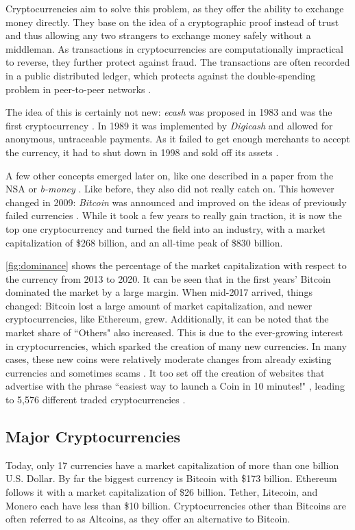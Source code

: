 \documentclass[11pt,a4paper,compsoc,conference]{IEEEtran}
\begin{document}
Cryptocurrencies aim to solve this problem, as they offer the ability to exchange money directly. They base on the idea of a cryptographic proof instead of trust and thus allowing any two strangers to exchange money safely without a middleman. As transactions in cryptocurrencies are computationally impractical to reverse, they further protect against fraud. The transactions are often recorded in a public distributed ledger, which protects against the double-spending problem in peer-to-peer networks \cite{Bitcoin}. 

The idea of this is certainly not new: \textit{ecash} was proposed in 1983 and was the first cryptocurrency \cite{ecash1, ecash2}. In 1989 it was implemented by \textit{Digicash} and allowed for anonymous, untraceable payments. As it failed to get enough merchants to accept the currency, it had to shut down in 1998 and sold off its assets \cite{digicash}.

A few other concepts emerged later on, like one described in a paper from the NSA \cite{nsa} or \textit{b-money} \cite{bmoney}. Like before, they also did not really catch on. This however changed in 2009: \textit{Bitcoin} was announced and improved on the ideas of previously failed currencies \cite{Bitcoin}. While it took a few years to really gain traction, it is now the top one cryptocurrency and turned the field into an industry, with a market capitalization of \$268 billion, and an all-time peak of \$830 billion.




\autoref{fig:dominance} shows the percentage of the market capitalization with respect to the currency from 2013 to 2020. It can be seen that in the first years' Bitcoin dominated the market by a large margin. When mid-2017 arrived, things changed: Bitcoin lost a large amount of market capitalization, and newer cryptocurrencies, like Ethereum, grew. Additionally, it can be noted that the market share of ``Others" also increased. This is due to the ever-growing interest in cryptocurrencies, which sparked the creation of many new currencies. In many cases, these new coins were relatively moderate changes from already existing currencies and sometimes scams \citep{deadcoins}. It too set off the creation of websites that advertise with the phrase ``easiest way to launch a Coin in 10 minutes!" \citep{cryptonote, cryptolife}, leading to 5,576 different traded cryptocurrencies \citep{coinmarketcap}.

\subsection{Major Cryptocurrencies}
Today, only 17 currencies have a market capitalization of more than one billion U.S. Dollar. By far the biggest currency is Bitcoin with \$173 billion. Ethereum follows it with a market capitalization of \$26 billion. Tether, Litecoin, and Monero each have less than \$10 billion. Cryptocurrencies other than Bitcoins are often referred to as Altcoins, as they offer an alternative to Bitcoin.
\end{document}
